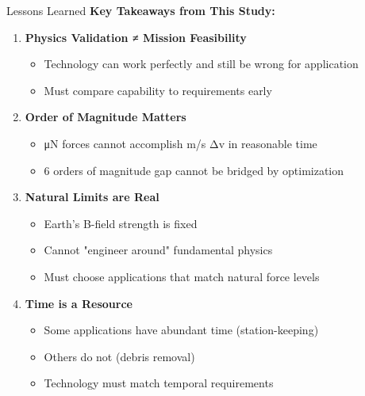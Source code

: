 \documentclass[aspectratio=169]{beamer}
\begin{document}
\begin{frame}{Lessons Learned}
\textbf{Key Takeaways from This Study:}

\vspace{0.5em}
\begin{enumerate}
    \item \textbf{Physics Validation ≠ Mission Feasibility}
    \begin{itemize}
        \item Technology can work perfectly and still be wrong for application
        \item Must compare capability to requirements early
    \end{itemize}

    \item \textbf{Order of Magnitude Matters}
    \begin{itemize}
        \item μN forces cannot accomplish m/s Δv in reasonable time
        \item 6 orders of magnitude gap cannot be bridged by optimization
    \end{itemize}

    \item \textbf{Natural Limits are Real}
    \begin{itemize}
        \item Earth's B-field strength is fixed
        \item Cannot "engineer around" fundamental physics
        \item Must choose applications that match natural force levels
    \end{itemize}

    \item \textbf{Time is a Resource}
    \begin{itemize}
        \item Some applications have abundant time (station-keeping)
        \item Others do not (debris removal)
        \item Technology must match temporal requirements
    \end{itemize}
\end{enumerate}
\end{frame}
\end{document}
